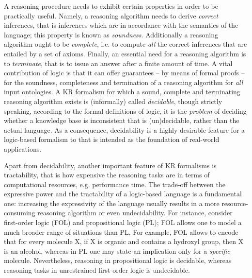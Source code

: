 \documentclass[10pt]{bmc_article}
\newenvironment{bmcformat}{\baselineskip20pt\sloppy\setboolean{publ}{false}}{\baselineskip20pt\sloppy}
\begin{document}
\begin{bmcformat}
A reasoning procedure needs to exhibit certain properties in order to be practically useful. Namely, a reasoning algorithm needs to derive \emph{correct} inferences, that is inferences which are in accordance with the semantics of the language; this property is known as \emph{soundness}. Additionally a reasoning algorithm ought to be \emph{complete}, i.e. to compute \emph{all} the correct inferences that are entailed by a set of axioms. Finally, an essential need for a reasoning algorithm is to \emph{terminate}, that is to issue an answer after a finite amount of time. A vital contribution of logic is that it can offer guarantees -- by means of formal proofs -- for the soundness, completeness and termination of a reasoning algorithm for \emph{all} input ontologies. A KR formalism for which a sound, complete and terminating reasoning algorithm exists is (informally) called \emph{decidable}, though strictly speaking, according to the formal definitions of logic, it is the \emph{problem} of deciding whether a knowledge base is inconsistent that is (un)decidable, rather than the actual language. As a consequence, decidability is a highly desirable feature for a logic-based formalism to that is intended as the foundation of real-world applications.

Apart from decidability, another important feature of KR formalisms is tractability, that is how expensive the reasoning tasks are in terms of computational resources, e.g. performance time. The trade-off between the expressive power and the tractability of a logic-based language is a fundamental one: increasing the expressivity of the language usually results in a more resource-consuming reasoning algorithm or even undecidability. For instance, consider first-order logic (FOL) and propositional logic (PL); FOL allows one to model a much broader range of situations than PL. For example, FOL allows to encode that for every molecule X, if X is organic and contains a hydroxyl group, then X is an alcohol, whereas in PL one may state an implication only for a \emph{specific} molecule. Nevertheless, reasoning in propositional logic is decidable, whereas reasoning tasks in unrestrained first-order logic is undecidable.


\end{bmcformat}
\end{document}
